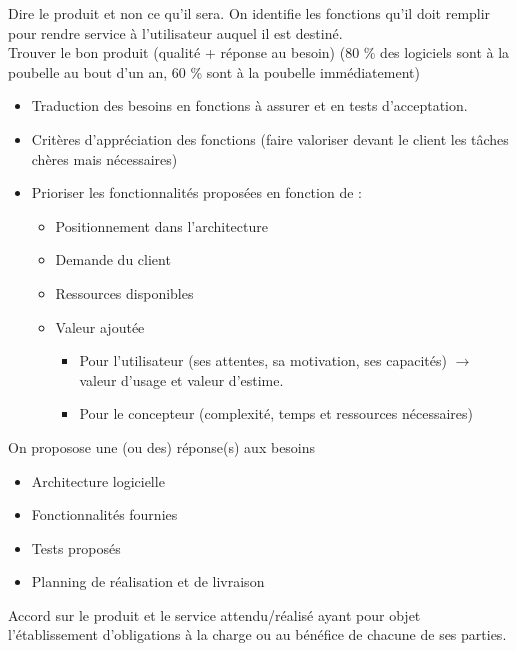  Dire  le produit et non ce qu'il sera. On identifie les fonctions qu'il doit remplir pour rendre service à l'utilisateur auquel il est destiné. \\

 Trouver le bon produit (qualité + réponse au besoin) (80 \% des logiciels sont à la poubelle au bout d'un an, 60 \% sont à la poubelle immédiatement)\\

\begin{itemize}
	\item Traduction des besoins en fonctions à assurer et en tests d'acceptation.
	\item Critères d'appréciation des fonctions (faire valoriser devant le client les tâches chères mais nécessaires)
	\item Prioriser les fonctionnalités proposées en fonction de :
	\begin{itemize}
		\item Positionnement dans l'architecture
		\item Demande du client
		\item Ressources disponibles
		\item Valeur ajoutée
		\begin{itemize}
			\item Pour l'utilisateur (ses attentes, sa motivation, ses capacités) $\rightarrow$ valeur d'usage et valeur d'estime.
			\item Pour le concepteur (complexité, temps et ressources nécessaires)
		\end{itemize}
	\end{itemize}
\end{itemize}

 On proposose une (ou des) réponse(s) aux besoins
\begin{itemize}
	\item Architecture logicielle
	\item Fonctionnalités fournies
	\item Tests proposés
	\item Planning de réalisation et de livraison
\end{itemize}

 Accord sur le produit et le service attendu/réalisé ayant pour objet l'établissement d'obligations à la charge ou au bénéfice de chacune de ses parties. \\

